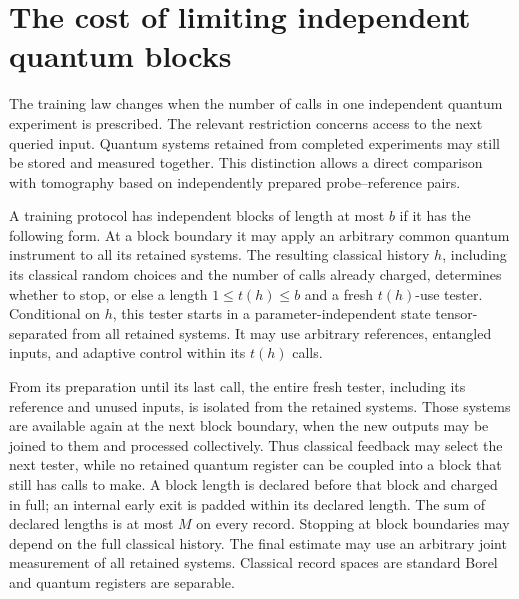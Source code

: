 \section{The cost of limiting independent quantum blocks}
\label{sec:blocklearning78}

The training law changes when the number of calls in one independent
quantum experiment is prescribed.  The relevant restriction concerns
access to the next queried input.  Quantum systems retained from completed
experiments may still be stored and measured together.  This distinction
allows a direct comparison with tomography based on independently
prepared probe--reference pairs.

\begin{definition}
\label{def:freshblocks78}
A training protocol has independent blocks of length at most $b$ if it
has the following form.  At a block boundary it may apply an arbitrary
common quantum instrument to all its retained systems.  The resulting
classical history $h$, including its classical random choices and the
number of calls already charged, determines whether to stop, or else a
length $1\le t(h)\le b$ and a fresh $t(h)$-use tester.  Conditional on
$h$, this tester starts in a parameter-independent state tensor-separated
from all retained systems.  It may use arbitrary references, entangled
inputs, and adaptive control within its $t(h)$ calls.

From its preparation until its last call, the entire fresh tester,
including its reference and unused inputs, is isolated from the retained
systems.  Those systems are available again at the next block boundary,
when the new outputs may be joined to them and processed collectively.
Thus classical feedback may select the next tester, while no retained
quantum register can be coupled into a block that still has calls to
make.  A block length is declared before that block and charged in full;
an internal early exit is padded within its declared length.  The sum of
declared lengths is at most $M$ on every record.  Stopping at block
boundaries may depend on the full classical history.  The final estimate
may use an arbitrary joint measurement of all retained systems.
Classical record spaces are standard Borel and quantum registers
are separable.
\end{definition}

